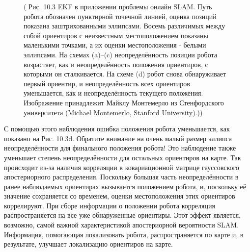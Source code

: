 \documentclass[10pt,a4paper]{article}
\begin{document}
\begin{figure}[H]
	\caption{ ( Рис. 10.3 EKF в приложении проблемы онлайн SLAM. Путь робота обозначен пунктирной точечной линией, оценка позиций показана заштрихованными эллипсами. Восемь различимых между собой ориентиров с неизвестным местоположением показаны маленькими точками, а их оценки местоположения - белыми эллипсами. На схемах (a)–(c) неопределённость позиции робота возрастает, как и неопределённость положения ориентиров, с которыми он сталкивается. На схеме (d) робот снова обнаруживает первый ориентир, и неопределённость всех ориентиров уменьшается, как и неопределённость текущего положения. Изображение принадлежит Майклу Монтемерло из Стенфордского университета (Michael Montemerlo, Stanford University).))}
	\label{fig:103orig}
\end{figure}

С помощью этого наблюдения ошибка положения робота уменьшается, как показано на Рис. 10.3d. Обратите внимание на очень малый размер эллипса неопределённости для финального положения робота! Это наблюдение также уменьшает степень неопределённости для остальных ориентиров на карте. Так происходит из-за наличия корреляции в ковариационной матрице гауссовского апостериорного распределения. Поскольку большая часть неопределённости в ранее наблюдаемых ориентирах вызывается положением робота, и, поскольку её значение сохраняется со временем, оценки местоположения этих ориентиров коррелируют. При сборе информации о положении робота корреляция распространяется на все уже обнаруженные ориентиры. Этот эффект является, возможно, самой важной характеристикой апостериорной вероятности SLAM. Информация, помогающая локализовать робота, распространяется по карте и, в результате, улучшает локализацию ориентиров на карте.\\
\end{document}
